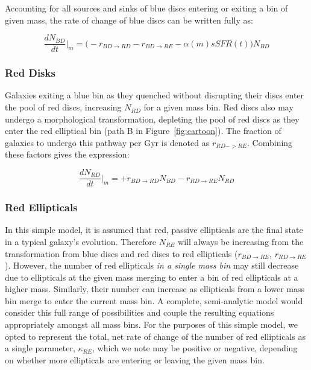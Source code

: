 \documentclass[useAMS,usenatbib]{mn2e}
\begin{document}
Accounting for all sources and sinks of blue discs entering or exiting a bin of given mass, the rate of change of blue discs can be written fully as:

\begin{equation}
\frac{dN_{BD}}{dt}\Big\rvert_{m} = \Big(-r_{BD \rightarrow RD} - r_{BD\rightarrow RE} -\alpha(m) sSFR(t) \Big)N_{BD}
\label{eqn:BD}
\end{equation}

\subsubsection{Red Disks}
Galaxies exiting a blue bin as they quenched without disrupting their discs enter the pool of red discs, increasing $N_{RD}$ for a given mass bin. Red discs also may undergo a morphological transformation, depleting the pool of red discs as they enter the red elliptical bin (path B in Figure~\ref{fig:cartoon}). The fraction of galaxies to undergo this pathway per Gyr is denoted as $r_{RD->RE}$. Combining these factors gives the expression: 

\begin{equation}
\frac{dN_{RD}}{dt}\Big\rvert_{m} = + r_{BD \rightarrow RD}N_{BD} - r_{RD \rightarrow RE}N_{RD}
\label{eqn:RD}
\end{equation}

\subsubsection{Red Ellipticals}
In this simple model, it is assumed that red, passive ellipticals are the final state in a typical galaxy's evolution. Therefore $N_{RE}$ will always be increasing from the transformation from blue discs and red discs to red ellipticals ($r_{BD \rightarrow RE}$, $r_{RD \rightarrow RE}$). However, the number of red ellipticals \emph{in a single mass bin} may still decrease due to ellipticals at the given mass merging to enter a bin of red ellipticals at a higher mass. Similarly, their number can increase as ellipticals from a lower mass bin merge to enter the current mass bin. A complete, semi-analytic model would consider this full range of possibilities and couple the resulting equations appropriately amongst all mass bins. For the purposes of this simple model, we opted to represent the total, net rate of change of the number of red ellipticals as a single parameter, $\kappa_{RE}$, which we note may be positive or negative, depending on whether more ellipticals are entering or leaving the given mass bin. 
\end{document}
